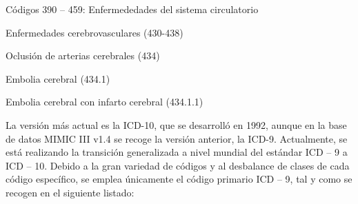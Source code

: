 \documentclass{report}
\begin{document}
\begin{myEnumerate}
\item   Códigos 390 -- 459: Enfermededades del sistema circulatorio
    \begin{myEnumerate}
    \item Enfermedades cerebrovasculares (430-438)
        \begin{myEnumerate}
        \item Oclusión de arterias cerebrales (434)
            \begin{myEnumerate}
            \item Embolia cerebral (434.1)
                \begin{myEnumerate}
                \item Embolia cerebral con infarto cerebral (434.1.1)
                \end{myEnumerate}
            \end{myEnumerate}
         \end{myEnumerate}
      \end{myEnumerate}
\end{myEnumerate}

La versión más actual es la ICD-10, que se desarrolló en 1992, aunque en
la base de datos MIMIC III v1.4 se recoge la versión anterior, la ICD-9.
Actualmente, se está realizando la transición generalizada a nivel
mundial del estándar ICD -- 9 a ICD -- 10. Debido a la gran variedad de códigos y al desbalance de clases de cada
código específico, se emplea únicamente el código primario ICD -- 9, tal
y como se recogen en el siguiente listado:
\end{document}
